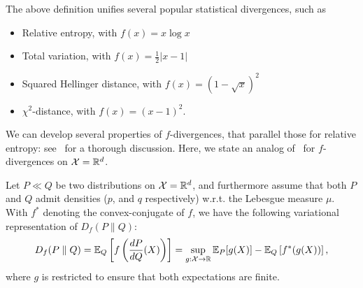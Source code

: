         \begin{remark}
            \label{remark:instances-of-f-div} 
            The above definition unifies several popular statistical divergences, such as 
            \begin{itemize}
                \item Relative entropy, with $f(x) = x \log x$ 
                \item Total variation, with $f(x) = \frac{1}{2}|x-1|$ 
                \item Squared Hellinger distance, with $f(x) = (1-\sqrt{x})^2$
                \item $\chi^2$-distance, with $f(x) = (x-1)^2$. 
            \end{itemize}
        \end{remark}
        We can develop several properties of $f$-divergences, that parallel those for relative entropy: see~\citet[Chapter 7]{polyanskiy2023ITbook} for a thorough discussion. Here, we state an analog of~ for $f$-divergences on $\mathcal{X} = \mathbb{R}^d$.  
        \begin{theorem}
            Let $P \ll Q$ be two distributions on $\mathcal{X} = \mathbb{R}^d$, and furthermore assume that both $P$ and $Q$ admit densities ($p$, and $q$ respectively) w.r.t. the Lebesgue measure $\mu$. With $f^*$ denoting the convex-conjugate of $f$, we have the following variational representation of $D_f(P\parallel Q)$: 
            \begin{align}
                D_f(P\parallel Q) = \mathbb{E}_Q \left[ f\left( \frac{dP}{dQ}(X) \right) \right] = \sup_{g:\mathcal{X} \to \mathbb{R}} \mathbb{E}_P[g(X)] - \mathbb{E}_Q\left[ f^*(g(X)) \right], 
            \end{align}
            where $g$ is restricted to ensure that both expectations are finite. 
        \end{theorem}
